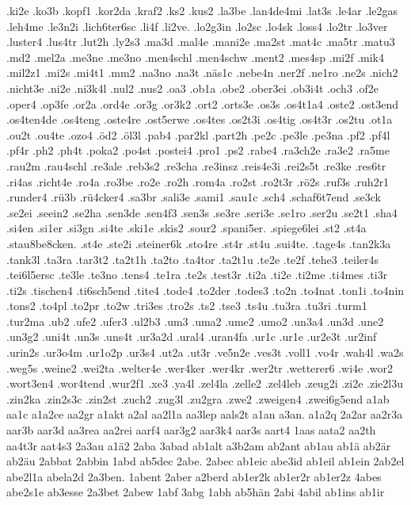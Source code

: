 {.ki2e
.ko3b
.kopf1
.kor2da
.kraf2
.ks2
.kus2
.la3be
.lan4de4mi
.lat3s
.le4ar
.le2gas
.leh4me
.le3n2i
.lich6ter6sc
.li4f
.li2ve.
.lo2g3in
.lo2sc
.lo4sk
.loss4
.lo2tr
.lo3ver
.luster4
.lus4tr
.lut2h
.ly2s3
.ma3d
.mal4e
.mani2e
.ma2st
.mat4c
.ma5tr
.matu3
.md2
.mel2a
.me3ne
.me3no
.men4schl
.men4schw
.ment2
.mes4sp
.mi2f
.mik4
.mil2z1
.mi2s
.mi4t1
.mm2
.na3no
.na3t
.näs1c
.nebe4n
.ner2f
.ne1ro
.ne2s
.nich2
.nicht3e
.ni2e
.ni3k4l
.nul2
.nus2
.oa3
.ob1a
.obe2
.ober3ei
.ob3i4t
.och3
.of2e
.oper4
.op3fe
.or2a
.ord4e
.or3g
.or3k2
.ort2
.orts3e
.os3s
.os4t1a4
.oste2
.ost3end
.os4ten4de
.os4teng
.oste4re
.ost5erwe
.os4tes
.os2t3i
.os4tig
.os4t3r
.os2tu
.ot1a
.ou2t
.ou4te
.ozo4
.öd2
.öl3l
.pab4
.par2kl
.part2h
.pe2c
.pe3le
.pe3na
.pf2
.pf4l
.pf4r
.ph2
.ph4t
.poka2
.po4st
.postei4
.pro1
.ps2
.rabe4
.ra3ch2e
.ra3e2
.ra5me
.rau2m
.rau4schl
.re3ale
.reb3s2
.re3cha
.re3insz
.reis4e3i
.rei2s5t
.re3ke
.res6tr
.ri4as
.richt4e
.ro4a
.ro3be
.ro2e
.ro2h
.rom4a
.ro2st
.ro2t3r
.rö2s
.ruf3s
.ruh2r1
.runder4
.rü3b
.rü4cker4
.sa3br
.sali3e
.sami1
.sau1c
.sch4
.schaf6t7end
.se3ck
.se2ei
.seein2
.se2ha
.sen3de
.sen4f3
.sen3s
.se3re
.seri3e
.se1ro
.ser2u
.se2t1
.sha4
.si4en
.si1er
.si3gn
.si4te
.ski1e
.skis2
.sour2
.spani5er.
.spiege6lei
.st2
.st4a
.stau8be8cken.
.st4e
.ste2i
.steiner6k
.sto4re
.st4r
.st4u
.sui4te.
.tage4s
.tan2k3a
.tank3l
.ta3ra
.tar3t2
.ta2t1h
.ta2to
.ta4tor
.ta2t1u
.te2e
.te2f
.tehe3
.teiler4s
.tei6l5ersc
.te3le
.te3no
.tens4
.te1ra
.te2s
.test3r
.ti2a
.ti2e
.ti2me
.ti4mes
.ti3r
.ti2s
.tischen4
.ti6sch5end
.tite4
.tode4
.to2der
.todes3
.to2n
.to4nat
.ton1i
.to4nin
.tons2
.to4pl
.to2pr
.to2w
.tri3es
.tro2s
.ts2
.tse3
.ts4u
.tu3ra
.tu3ri
.turm1
.tur2ma
.ub2
.ufe2
.ufer3
.ul2b3
.um3
.uma2
.ume2
.umo2
.un3a4
.un3d
.une2
.un3g2
.uni4t
.un3s
.uns4t
.ur3a2d
.ural4
.uran4fa
.ur1c
.ur1e
.ur2e3t
.ur2inf
.urin2s
.ur3o4m
.ur1o2p
.ur3s4
.ut2a
.ut3r
.ve5n2e
.ves3t
.voll1
.vo4r
.wah4l
.wa2s
.weg5s
.weine2
.wei2ta
.welter4e
.wer4ker
.wer4kr
.wer2tr
.wetterer6
.wi4e
.wor2
.wort3en4
.wor4tend
.wur2f1
.xe3
.ya4l
.zel4la
.zelle2
.zel4leb
.zeug2i
.zi2e
.zie2l3u
.zin2ka
.zin2s3c
.zin2st
.zuch2
.zug3l
.zu2gra
.zwe2
.zweigen4
.zwei6g5end
a1ab
aa1c
a1a2ce
aa2gr
a1akt
a2al
aa2l1a
aa3lep
aals2t
a1an
a3an.
a1a2q
2a2ar
aa2r3a
aar3b
aar3d
aa3rea
aa2rei
aarf4
aar3g2
aar3k4
aar3s
aart4
1aas
aata2
aa2th
aa4t3r
aat4s3
2a3au
a1ä2
2aba
3abad
ab1alt
a3b2am
ab2ant
ab1au
ab1ä
ab2är
ab2äu
2abbat
2abbin
1abd
ab5dec
2abe.
2abec
ab1eic
abe3id
ab1eil
ab1ein
2ab2el
abe2l1a
abela2d
2a3ben.
1abent
2aber
a2berd
ab1er2k
ab1er2r
ab1er2z
4abes
abe2s1e
ab3esse
2a3bet
2abew
1abf
3abg
1abh
ab5hän
2abi
4abil
ab1ins
ab1ir
}
